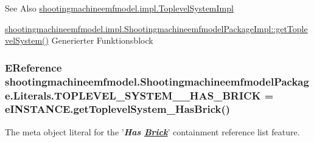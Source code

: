 \begin{DoxySeeAlso}{See Also}
\hyperlink{classshootingmachineemfmodel_1_1impl_1_1_toplevel_system_impl}{shootingmachineemfmodel.\-impl.\-Toplevel\-System\-Impl} 

\hyperlink{classshootingmachineemfmodel_1_1impl_1_1_shootingmachineemfmodel_package_impl_abc4b230ae491dbad8ba7ba99b4ad6a76}{shootingmachineemfmodel.\-impl.\-Shootingmachineemfmodel\-Package\-Impl\-::get\-Toplevel\-System()} Generierter Funktionsblock 
\end{DoxySeeAlso}
\hypertarget{interfaceshootingmachineemfmodel_1_1_shootingmachineemfmodel_package_1_1_literals_aaeba17ff3572f5fbff404d80a6d180bc}{
\subsubsection[{T\-O\-P\-L\-E\-V\-E\-L\-\_\-\-S\-Y\-S\-T\-E\-M\-\_\-\-\_\-\-H\-A\-S\-\_\-\-B\-R\-I\-C\-K}]{\setlength{\rightskip}{0pt plus 5cm}E\-Reference shootingmachineemfmodel.\-Shootingmachineemfmodel\-Package.\-Literals.\-T\-O\-P\-L\-E\-V\-E\-L\-\_\-\-S\-Y\-S\-T\-E\-M\-\_\-\-\_\-\-H\-A\-S\-\_\-\-B\-R\-I\-C\-K = e\-I\-N\-S\-T\-A\-N\-C\-E.\-get\-Toplevel\-System\-\_\-\-Has\-Brick()}}\label{interfaceshootingmachineemfmodel_1_1_shootingmachineemfmodel_package_1_1_literals_aaeba17ff3572f5fbff404d80a6d180bc}
The meta object literal for the '{\itshape {\bfseries Has \hyperlink{interfaceshootingmachineemfmodel_1_1_brick}{Brick}}}' containment reference list feature.

